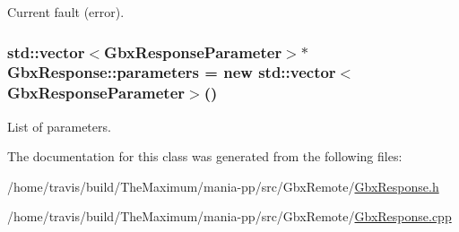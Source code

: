Current fault (error). 

\hypertarget{classGbxResponse_afcbec4555fa682d9d1360ecff829d0f2}{
\subsubsection[{parameters}]{\setlength{\rightskip}{0pt plus 5cm}std\-::vector$<${\bf Gbx\-Response\-Parameter}$>$$\ast$ Gbx\-Response\-::parameters = new std\-::vector$<${\bf Gbx\-Response\-Parameter}$>$()\hspace{0.3cm}{\ttfamily [private]}}}\label{classGbxResponse_afcbec4555fa682d9d1360ecff829d0f2}


List of parameters. 



The documentation for this class was generated from the following files\-:\begin{DoxyCompactItemize}
\item 
/home/travis/build/\-The\-Maximum/mania-\/pp/src/\-Gbx\-Remote/\hyperlink{GbxResponse_8h}{Gbx\-Response.\-h}\item 
/home/travis/build/\-The\-Maximum/mania-\/pp/src/\-Gbx\-Remote/\hyperlink{GbxResponse_8cpp}{Gbx\-Response.\-cpp}\end{DoxyCompactItemize}
